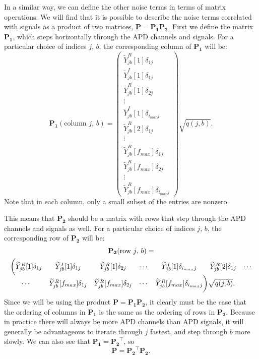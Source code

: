 In a similar way, we can define the other noise terms in terms of matrix operations.  We will find that it is possible to describe the noise terms correlated with signals as a product of two matrices, $\mathbf{P = P_1 P_2}$.  First we define the matrix $\mathbf{P_1}$, which steps horizontally through the APD channels and signals.  For a particular choice of indices $j$, $b$, the corresponding column of $\mathbf{P_1}$ will be:
\begin{equation}
\mathbf{P_1}(\text{column $j$, $b$}) = \begin{pmatrix}
\widetilde{Y}^R_{j b}[1] \delta_{1 j} \\
\widetilde{Y}^I_{j b}[1] \delta_{1 j} \\
\widetilde{Y}^R_{j b}[1] \delta_{2 j} \\
\vdots \\
\widetilde{Y}^I_{j b}[1] \delta_{i_{max} j} \\
\widetilde{Y}^R_{j b}[2] \delta_{1 j} \\
\vdots \\
\widetilde{Y}^R_{j b}[f_{max}] \delta_{1 j} \\
\widetilde{Y}^R_{j b}[f_{max}] \delta_{2 j} \\
\vdots \\
\widetilde{Y}^R_{j b}[f_{max}] \delta_{i_{max} j}
\end{pmatrix}\sqrt{q(j,b)}.
\end{equation}
Note that in each column, only a small subset of the entries are nonzero.

This means that $\mathbf{P_2}$ should be a matrix with rows that step through the APD channels and signals as well.  For a particular choice of indices $j$, $b$, the corresponding row of $\mathbf{P_2}$ will be:
\begin{multline} \mathbf{P_2}(\text{row $j$, $b$}) = \\
\begin{matrix}
\bigg( \widetilde{Y}^R_{jb}[1]\delta_{1 j} & \widetilde{Y}^I_{j b}[1]\delta_{1 j} & \widetilde{Y}^R_{jb}[1]\delta_{2 j} & \cdots & \widetilde{Y}^I_{jb}[1]\delta_{i_{max} j} & \widetilde{Y}^R_{jb}[2]\delta_{1 j} & \cdots \\
\cdots & \widetilde{Y}^R_{jb}[f_{max}]\delta_{1 j} & \widetilde{Y}^R_{jb}[f_{max}]\delta_{2 j} & \cdots & \widetilde{Y}^R_{jb}[f_{max}]\delta_{i_{max} j}\rlap{$\bigg) \sqrt{q(j,b)}.$}
\end{matrix}\end{multline}
Since we will be using the product $\mathbf{P} = \mathbf{P_1 P_2}$, it clearly must be the case that the ordering of columns in $\mathbf{P_1}$ is the same as the ordering of rows in $\mathbf{P_2}$.  Because in practice there will always be more APD channels than APD signals, it will generally be advantageous to iterate through $j$ fastest, and step through $b$ more slowly.  We can also see that $\mathbf{P_1} = \mathbf{P_2}^{\top}$, so
\begin{equation}
\mathbf{P} = \mathbf{P_2}^{\top} \mathbf{P_2}.
\end{equation}


